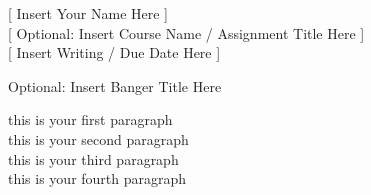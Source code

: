 \documentclass[12pt]{article}
\begin{document}
{
\noindent
{[ Insert Your Name Here ]} \\
{[ Optional: Insert Course Name / Assignment Title Here ]} \\
{[ Insert Writing / Due Date Here ]}
} 

\centerline{Optional: Insert Banger Title Here}

this is your first paragraph \\

this is your second paragraph \\

this is your third paragraph \\

this is your fourth paragraph \\
\end{document}
